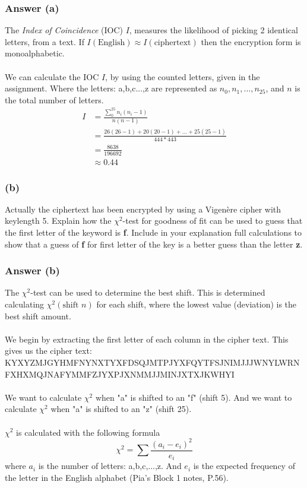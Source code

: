 \documentclass{article}
\begin{document}
	\subsubsection*{Answer (a)}
	The \textit{Index of Coincidence} (IOC) $I$, measures the likelihood of picking 2 identical letters, from a text. If $I(\text{English}) \approx I(\text{ciphertext})$ then the encryption form is monoalphabetic.
	\\\\
	We can calculate the IOC $I$, by using the counted letters, given in the assignment. Where the  letters: a,b,c...,z are represented as $n_0,n_1,...,n_{25}$, and $n$ is the total number of letters. 
	\[
	\begin{split}
	I &= \frac{\sum_{0}^{25}n_i(n_i-1)}{n(n-1)} \\
	&=\frac{26(26-1)+20(20-1)+...+25(25-1)}{444*443} \\
	&=\frac{8638}{196692} \\
	&\approx0.44
	\end{split}
	\]
	
	\subsubsection*{(b)}
	Actually the ciphertext has been encrypted by using a Vigenère cipher with
	keylength 5. Explain how the $\chi^2$-test for goodness of fit can be used to guess that
	the first letter of the keyword is \textbf{f}. Include in your explanation full calculations to
	show that a guess of \textbf{f} for first letter of the key is a better guess than the letter \textbf{z}.
	
	\subsubsection*{Answer (b)}
	The $\chi^2$-test can be used to determine the best shift. This is determined calculating $\chi^2(\text{shift } n)$ for each shift, where the lowest value (deviation) is the best shift amount.  
	\\\\
	We begin by extracting the first letter of each column in the cipher text. This gives us the cipher text: 
	KYXYZMJGYHMFNYNXTYXFDSQJMTPJYXFQYTFSJNIMJJJWNYLWRNFXHXMQJNAFYMMFZJYXPJXNMMJJMINJXTXJKWHYI
	\\\\
	We want to calculate $\chi^2$ when "a" is shifted to an "f" (shift 5). And we want to calculate $\chi^2$ when "a" is shifted to an "z" (shift 25). 
	\\\\
	$\chi^2$ is calculated with the following formula
	$$
	\chi^2=\sum\frac{(a_i-e_i)^2}{e_i}
	$$
	where $a_i$ is the number of letters: a,b,c,...,z. And $e_i$ is the expected frequency of the letter in the English alphabet (Pia's Block 1 notes, P.56).
\end{document}
